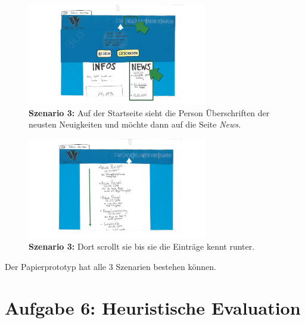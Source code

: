 \documentclass{scrartcl}
\begin{document}
\begin{enumerate}
\begin{figure}[H]
 \begin{center}
 \includegraphics[width=0.7\textwidth]{szenario3-1.jpg}
\caption{\textbf{Szenario 3:} Auf der Startseite sieht die Person Überschriften der neusten Neuigkeiten und möchte dann auf die Seite \textit{News}.}
 \end{center}
\end{figure}  
\begin{figure}[H]
 \begin{center}
 \includegraphics[width=0.7\textwidth]{szenario3-2.jpg}
\caption{\textbf{Szenario 3:} Dort scrollt sie bis sie die Einträge kennt runter.}
 \end{center}
\end{figure}  
\end{enumerate}
Der Papierprototyp hat alle 3 Szenarien bestehen können. 
\section*{Aufgabe 6: Heuristische Evaluation}
\end{document}
